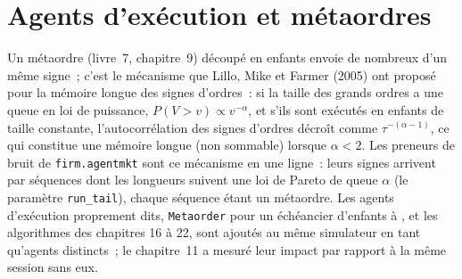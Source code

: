 \begin{omfigure}

\label{fig:mx:build-an-agent-based-market:inv}
\end{omfigure}

\section{Agents d'exécution et métaordres}

Un métaordre (livre~7, chapitre~9) découpé en enfants envoie de nombreux  d'un même signe~; c'est le mécanisme que Lillo, Mike et Farmer (2005) ont proposé pour
la mémoire longue des signes d'ordres~: si la taille des grands ordres a une queue en loi de puissance, $P(V > v) \propto v^{-\alpha}$, et s'ils sont exécutés en enfants de
taille constante, l'autocorrélation des signes d'ordres décroît comme $\tau^{-(\alpha - 1)}$, ce qui constitue une mémoire longue (non sommable) lorsque $\alpha < 2$. Les preneurs
de bruit de \texttt{firm.agentmkt} sont ce mécanisme en une ligne~: leurs signes arrivent par séquences dont les longueurs suivent une loi de Pareto de queue $\alpha$ (le paramètre
\texttt{run\_tail}), chaque séquence étant un métaordre. Les agents d'exécution proprement dits, \texttt{Metaorder} pour un échéancier d'enfants à , et les algorithmes des
chapitres 16 à 22, sont ajoutés au même simulateur en tant qu'agents distincts~; le chapitre~11 a mesuré leur impact par rapport à la même session sans eux.

